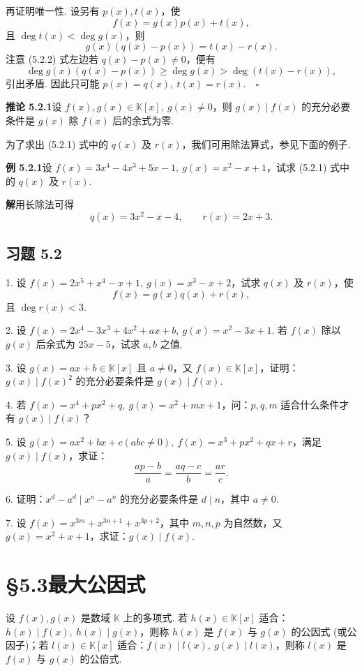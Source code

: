 \documentclass[UTF8,12pt,a4paper,fontset=fandol]{ctexart}
\begin{document}
再证明唯一性. 设另有 $p(x),t(x)$，使
\[
f(x)=g(x)p(x)+t(x),
\]
且 $\deg t(x)<\deg g(x)$，则
\begin{equation}
g(x)(q(x)-p(x))=t(x)-r(x).
\tag{5.2.2}
\end{equation}
注意 (5.2.2) 式左边若 $q(x)-p(x)\neq 0$，便有
\[
\deg g(x)(q(x)-p(x))\geq \deg g(x)>\deg(t(x)-r(x)),
\]
引出矛盾. 因此只可能 $p(x)=q(x),\ t(x)=r(x).\quad \square$

\noindent\textbf{推论 5.2.1}\quad 设 $f(x),g(x)\in\mathbb{K}[x],\ g(x)\neq 0$，则 $g(x)\mid f(x)$ 的充分必要条件是 $g(x)$ 除 $f(x)$ 后的余式为零.

为了求出 (5.2.1) 式中的 $q(x)$ 及 $r(x)$，我们可用除法算式，参见下面的例子.

\noindent\textbf{例 5.2.1}\quad 设 $f(x)=3x^4-4x^3+5x-1,\ g(x)=x^2-x+1$，试求 (5.2.1) 式中的 $q(x)$ 及 $r(x)$.

\noindent\textbf{解}\quad 用长除法可得
\[
q(x)=3x^2-x-4,\qquad r(x)=2x+3.
\]

\subsection*{习题 5.2}

1. 设 $f(x)=2x^5+x^4-x+1,\ g(x)=x^3-x+2$，试求 $q(x)$ 及 $r(x)$，使
\[
f(x)=g(x)q(x)+r(x),
\]
且 $\deg r(x)<3$.

2. 设 $f(x)=2x^4-3x^3+4x^2+ax+b,\ g(x)=x^2-3x+1$. 若 $f(x)$ 除以 $g(x)$ 后余式为 $25x-5$，试求 $a,b$ 之值.

3. 设 $g(x)=ax+b\in\mathbb{K}[x]$ 且 $a\neq 0$，又 $f(x)\in\mathbb{K}[x]$，证明：$g(x)\mid f(x)^2$ 的充分必要条件是 $g(x)\mid f(x)$.

4. 若 $f(x)=x^4+px^2+q,\ g(x)=x^2+mx+1$，问：$p,q,m$ 适合什么条件才有 $g(x)\mid f(x)$？

5. 设 $g(x)=ax^2+bx+c(abc\neq 0),\ f(x)=x^3+px^2+qx+r$，满足 $g(x)\mid f(x)$，求证：
\[
\frac{ap-b}{a}=\frac{aq-c}{b}=\frac{ar}{c}.
\]

6. 证明：$x^d-a^d\mid x^n-a^n$ 的充分必要条件是 $d\mid n$，其中 $a\neq 0$.

7. 设 $f(x)=x^{3m}+x^{3n+1}+x^{3p+2}$，其中 $m,n,p$ 为自然数，又 $g(x)=x^2+x+1$，求证：$g(x)\mid f(x)$.

\section*{§5.3\quad 最大公因式}

设 $f(x),g(x)$ 是数域 $\mathbb{K}$ 上的多项式. 若 $h(x)\in\mathbb{K}[x]$ 适合：$h(x)\mid f(x),\ h(x)\mid g(x)$，则称 $h(x)$ 是 $f(x)$ 与 $g(x)$ 的公因式 (或公因子)；若 $l(x)\in\mathbb{K}[x]$ 适合：$f(x)\mid l(x),\ g(x)\mid l(x)$，则称 $l(x)$ 是 $f(x)$ 与 $g(x)$ 的公倍式.
\end{document}
